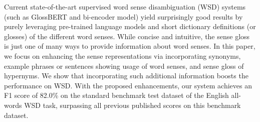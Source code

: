 Current state-of-the-art supervised word sense disambiguation (WSD) systems (such as GlossBERT and bi-encoder model) yield surprisingly good results by purely leveraging pre-trained language models and short dictionary definitions (or glosses) of the different word senses. While concise and intuitive, the sense gloss is just one of many ways to provide information about word senses. In this paper, we focus on enhancing the sense representations via incorporating synonyms, example phrases or sentences showing usage of word senses, and sense gloss of hypernyms. We show that incorporating such additional information boosts the performance on WSD. With the proposed enhancements, our system achieves an F1 score of 82.0\% on the standard benchmark test dataset of the English all-words WSD task, surpassing all previous published scores on this benchmark dataset.
